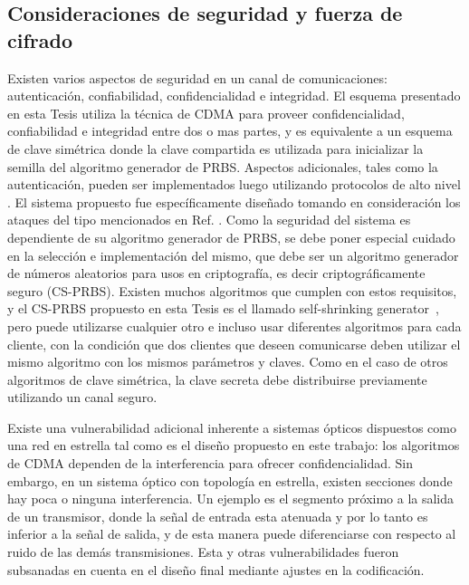 \subsection{Consideraciones de seguridad y fuerza de cifrado}\label{Seguridad-fuerza}
Existen varios aspectos de seguridad en un canal de comunicaciones: autenticación, confiabilidad, confidencialidad e integridad.
El esquema presentado en esta Tesis utiliza la técnica de CDMA para proveer confidencialidad, confiabilidad e integridad entre dos o mas partes, y es equivalente a un esquema de clave simétrica donde la clave compartida es utilizada para inicializar la semilla del algoritmo generador de PRBS. Aspectos adicionales, tales como la autenticación, pueden ser implementados luego utilizando protocolos de alto nivel \cite{krawczyk2001order}.
El sistema propuesto fue específicamente diseñado tomando en consideración los ataques del tipo mencionados en Ref. \cite{Shake:05}.
Como la seguridad del sistema es dependiente de su algoritmo generador de PRBS, se debe poner especial cuidado en la selección e implementación del mismo, que debe ser un algoritmo generador de números aleatorios para usos en criptografía, es decir criptográficamente seguro (CS-PRBS). Existen muchos algoritmos que cumplen con estos requisitos, y el CS-PRBS propuesto en esta Tesis es el llamado self-shrinking generator~\cite{Meier:94}, pero puede utilizarse cualquier otro e incluso usar diferentes algoritmos para cada cliente, con la condición que dos clientes que deseen comunicarse deben utilizar el mismo algoritmo con los mismos parámetros y claves.
Como en el caso de otros algoritmos de clave simétrica, la clave secreta debe distribuirse previamente utilizando un canal seguro.

Existe una vulnerabilidad adicional inherente a sistemas ópticos dispuestos como una red en estrella tal como es el diseño propuesto en este trabajo: los algoritmos de CDMA dependen de la interferencia para ofrecer confidencialidad. Sin embargo, en un sistema óptico con topología en estrella, existen secciones donde hay poca o ninguna interferencia. Un ejemplo es el segmento próximo a la salida de un transmisor, donde la señal de entrada esta atenuada y por lo tanto es inferior a la señal de salida, y de esta manera puede diferenciarse con respecto al ruido de las demás transmisiones.   
Esta y otras vulnerabilidades fueron subsanadas en cuenta en el diseño final mediante ajustes en la codificación.

